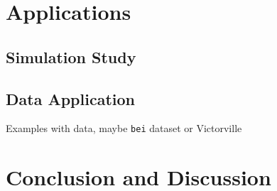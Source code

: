 \documentclass[]{interact}
\begin{document}
\section{Applications}


\subsection{Simulation Study}

\subsection{Data Application}

Examples with data, maybe \texttt{bei} dataset or Victorville


\section{Conclusion and Discussion}







\end{document}
